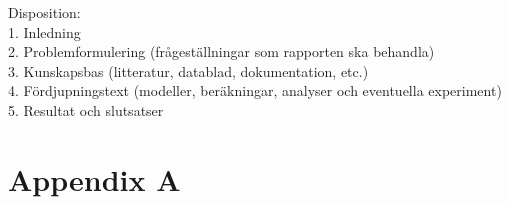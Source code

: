 \documentclass[a4paper,12pt,fleqn]{article}
\begin{document}
Disposition: 
\\
1. Inledning 
\\
2. Problemformulering (frågeställningar som rapporten ska behandla) 
\\
3. Kunskapsbas (litteratur, datablad, dokumentation, etc.) 
\\
4. Fördjupningstext (modeller, beräkningar, analyser och eventuella experiment) 
\\
5. Resultat och slutsatser 






\newpage
\appendix
\pagestyle{empty}
\section{Appendix A}
\end{document}
